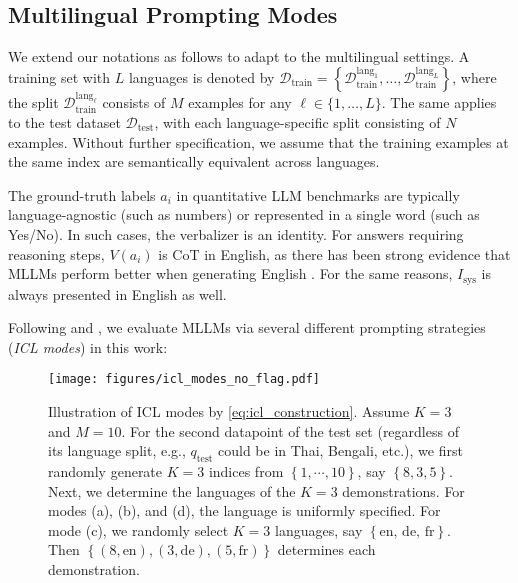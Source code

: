 \subsection{Multilingual Prompting Modes} \label{sec:multiling_icl:modes}
We extend our notations as follows to adapt to the multilingual settings.
A training set with $L$ languages is denoted by $\mathcal{D}_\text{train} = \left\{\mathcal{D}_\text{train}^{\text{lang}_1}, \ldots, \mathcal{D}_\text{train}^{\text{lang}_L} \right\}$, %
where the split $\mathcal{D}_\text{train}^{\text{lang}_\ell}$ consists of $M$ examples for any $\ell\in \{1, \ldots, L\}$.
The same applies to the test dataset $\mathcal{D}_\text{test}$, with each language-specific split consisting of $N$ examples.
Without further specification, we assume that the training examples at the same index are semantically equivalent across languages.

The ground-truth labels $a_i$ in quantitative LLM benchmarks  are typically language-agnostic (such as numbers) or represented in a single word (such as Yes/No).
In such cases, the verbalizer is an identity.
For answers requiring reasoning steps, $V(a_i)$ is CoT in English, as there has been strong evidence that MLLMs perform better when generating English .
For the same reasons, $I_\text{sys}$ is always presented in English as well.

Following \citet{mega} and \citet{mgsm}, we evaluate MLLMs via several different prompting strategies (\textit{ICL modes}) in this work:

\begin{figure}[t]
  \centering
  \texttt{[image: figures/icl\_modes\_no\_flag.pdf]}
  \caption{Illustration of ICL modes by \cref{eq:icl_construction}. Assume $K=3$ and $M=10$. For the second datapoint of the test set (regardless of its language split, e.g., $q_\text{test}$ could be in Thai, Bengali, etc.), we first randomly generate $K=3$ indices from $\left\{1, \cdots, 10\right\}$, say $\left\{8,3,5\right\}$.  Next, we determine the languages of the $K=3$ demonstrations. For modes (a), (b), and (d), the language is uniformly specified. For mode (c), we randomly select $K=3$ languages, say $\left\{\text{en, de, fr}\right\}$. Then $\left\{(8, \text{en}), (3, \text{de}), (5, \text{fr})\right\}$ determines each demonstration.
  }
  \vspace{-5pt}
  \label{fig:icl_modes}
\end{figure}

